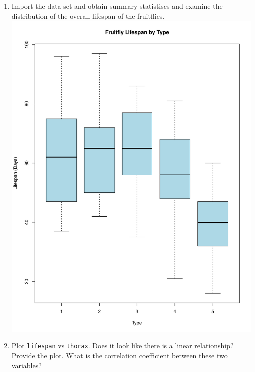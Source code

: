\documentclass[12pt,letterpaper]{article}
\begin{document}
\begin{enumerate}
	
	\item
	Import the data set and obtain summary statistiscs and examine the distribution of the overall lifespan of the fruitflies.  
	\includegraphics{plot3-1 boxplot}
	
\newpage
	\item
	Plot \texttt{lifespan} vs \texttt{thorax}. Does it look like there is a linear relationship? Provide the plot. What is the correlation coefficient between these two variables?
		\vspace{6cm}

\end{enumerate}
\end{document}
